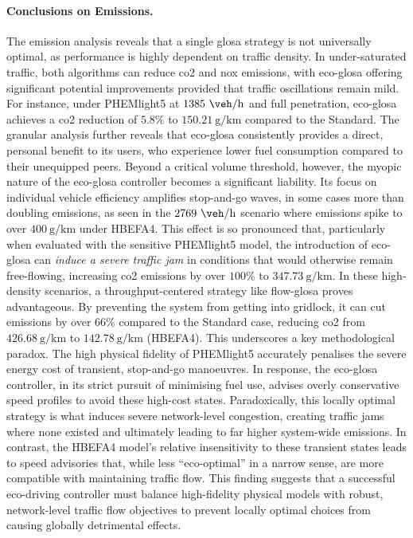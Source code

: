 \paragraph{Conclusions on Emissions.}
The emission analysis reveals that a single \ac{glosa} strategy is not universally optimal, as performance is highly dependent on traffic density. In under-saturated traffic, both algorithms can reduce \ac{co2} and \ac{nox} emissions, with \ac{eco-glosa} offering significant potential improvements provided that traffic oscillations remain mild. For instance, under PHEMlight5 at $1385~\unit{\veh\per\hour}$ and full penetration, \ac{eco-glosa} achieves a \ac{co2} reduction of $5.8\%$ to $150.21~\unit{\gram\per\kilo\metre}$ compared to the Standard. The granular analysis further reveals that \ac{eco-glosa} consistently provides a direct, personal benefit to its users, who experience lower fuel consumption compared to their unequipped peers.
\mynewline
Beyond a critical volume threshold, however, the myopic nature of the \ac{eco-glosa} controller becomes a significant liability. Its focus on individual vehicle efficiency amplifies stop-and-go waves, in some cases more than doubling emissions, as seen in the $2769~\unit{\veh\per\hour}$ scenario where emissions spike to over $400~\unit{\gram\per\kilo\metre}$ under HBEFA4. This effect is so pronounced that, particularly when evaluated with the sensitive PHEMlight5 model, the introduction of \ac{eco-glosa} can \textit{induce a severe traffic jam} in conditions that would otherwise remain free-flowing, increasing \ac{co2} emissions by over $100\%$ to $347.73~\unit{\gram\per\kilo\metre}$. In these high-density scenarios, a throughput-centered strategy like \ac{flow-glosa} proves advantageous. By preventing the system from getting into gridlock, it can cut emissions by over $66\%$ compared to the Standard case, reducing \ac{co2} from $426.68~\unit{\gram\per\kilo\metre}$ to $142.78~\unit{\gram\per\kilo\metre}$ (HBEFA4).
\mynewline
This underscores a key methodological paradox. The high physical fidelity of PHEMlight5 accurately penalises the severe energy cost of transient, stop-and-go manoeuvres. In response, the \ac{eco-glosa} controller, in its strict pursuit of minimising fuel use, advises overly conservative speed profiles to avoid these high-cost states. Paradoxically, this locally optimal strategy is what induces severe network-level congestion, creating traffic jams where none existed and ultimately leading to far higher system-wide emissions. In contrast, the HBEFA4 model's relative insensitivity to these transient states leads to speed advisories that, while less \enquote{eco-optimal} in a narrow sense, are more compatible with maintaining traffic flow. This finding suggests that a successful eco-driving controller must balance high-fidelity physical models with robust, network-level traffic flow objectives to prevent locally optimal choices from causing globally detrimental effects.


